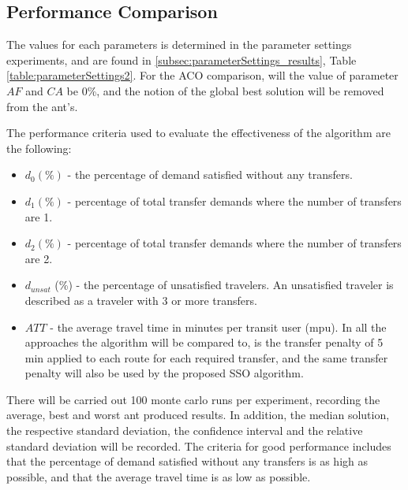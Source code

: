 \subsection{Performance Comparison}
\label{subsec:performanceComparison_setup}

The values for each parameters is determined in the parameter settings experiments, and are found in \vref{subsec:parameterSettings_results}, Table \vref{table:parameterSettings2}. For the ACO comparison, will the value of parameter $AF$ and $CA$ be 0\%, and the notion of the global best solution will be removed from the ant's. 

The performance criteria used to evaluate the effectiveness of the algorithm are the following:
\begin{itemize}
\item $d_0 (\%)$ - the percentage of demand satisfied without any transfers. 
\item $d_1 (\%)$ - percentage of total transfer demands where the number of transfers are 1. 
\item $d_2 (\%)$ - percentage of total transfer demands where the number of transfers are 2. 
\item $d_{unsat}$ (\%) - the percentage of unsatisfied travelers. An unsatisfied traveler is described as a traveler with 3 or more transfers. 
\item $ATT$  - the average travel time in minutes per transit user (mpu). In all the approaches the algorithm will be compared to, is the transfer penalty of 5 min applied to each route for each required transfer, and the same transfer penalty will also be used by the proposed SSO algorithm.

\end{itemize}

There will be carried out 100 monte carlo runs per experiment, recording the average, best and worst ant produced results. In addition, the median solution, the respective standard deviation, the confidence interval and the relative standard deviation will be recorded. The criteria for good performance includes that the percentage of demand satisfied without any transfers is as high as possible, and that the average travel time is as low as possible.

